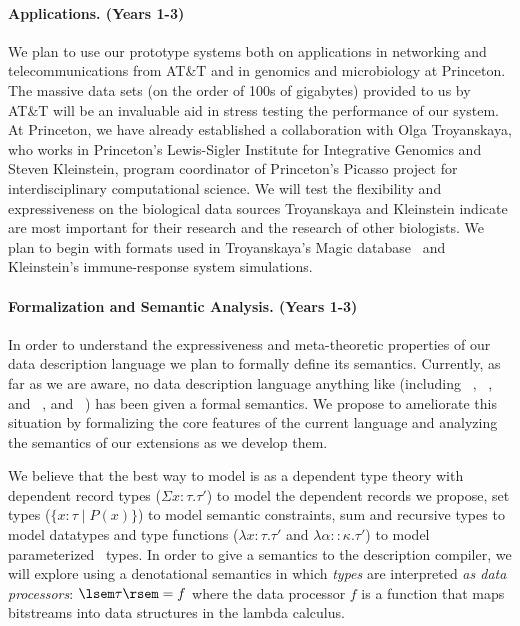 \documentclass[11pt]{article}
\begin{document}
\paragraph*{Applications.  (Years 1-3)}
We plan to use our prototype systems both on applications
in networking and telecommunications from AT\&T and in genomics and
microbiology at Princeton.  The massive data sets (on the order of
100s of gigabytes) provided to us by AT\&T will be an
invaluable aid in stress testing the performance of our system.
At Princeton, we have already established
a collaboration with Olga Troyanskaya, who works in Princeton's 
Lewis-Sigler Institute 
for Integrative Genomics and Steven Kleinstein, program coordinator of
Princeton's Picasso project for interdisciplinary 
computational science.  We will test the flexibility
and expressiveness on the biological data sources
Troyanskaya and Kleinstein indicate are most important
for their research and the research of other biologists.
We plan to begin with formats used in Troyanskaya's Magic 
database~\cite{magic} and Kleinstein's immune-response system 
simulations.

\paragraph*{Formalization and Semantic Analysis. (Years 1-3)}
In order to understand the expressiveness and meta-theoretic
properties of our data description language
we plan to formally define its semantics.
Currently, as far as we are aware, no data description language
anything like \datatype{}
(including \pads~\cite{pads}, \packettypes~\cite{sigcomm00}, and \datascript~\cite{gpce02}, and \blt~\cite{eger:blt})
has been given a formal semantics.  
We propose to ameliorate this situation by
formalizing the core features of the current language
and analyzing the semantics of our extensions as we develop them.

We believe that the best way to model \datatype{} is as a dependent
type theory with dependent record types ($\Sigma x{:}\tau.\tau'$) to model
the dependent records we propose, set types 
($\{x{:}\tau \; | \; P(x) \}$) to model
semantic constraints, sum and recursive types to model
datatypes and type functions
($\lambda x{:}\tau.\tau'$ and $\lambda \alpha{::}\kappa.\tau'$) 
to model parameterized \pads{}\ types.  
In order to give a semantics to the \datatype{} description
compiler, we will explore using
a denotational semantics in which {\em types} are interpreted 
{\em as data processors}:  $\lsem \tau \rsem = f$
where the data processor $f$ is a function that maps bitstreams into 
data structures in the lambda calculus. 
\end{document}
